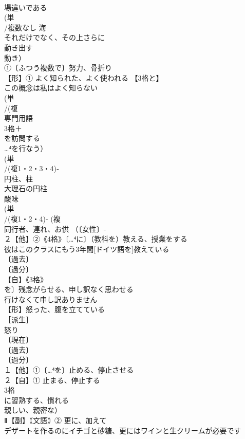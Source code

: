 \documentclass[8pt]{extreport}
\begin{document}
\begin{CJK}{UTF8}{min}
\\	場違いである 
\\	(単
\\	/複数なし 海 
\\	それだけでなく、その上さらに
\\	動き出す 
\\	動き）
\\	①〔ふつう複数で〕努力、骨折り 
\\	【形】① よく知られた、よく使われる 【3格と】
\\	この概念は私はよく知らない
\\	(単
\\	/(複
\\	専門用語 
\\	3格＋
\\	を訪問する 
\\	…⁴を行なう）
\\	(単
\\	/(複1・2・3・4)‐
\\	円柱、柱 
\\	大理石の円柱 
\\	酸味 
\\	(単
\\	/(複1・2・4)- (複
\\	同行者、連れ、お供 （〔女性〕-
\\	２【他】②《4格》〔…⁴に〕（教科を）教える、授業をする　
\\	彼はこのクラスにもう3年間[ドイツ語を]教えている
\\	〔過去〕
\\	〔過分〕
\\	【自】《3格》
\\	を〕残念がらせる、申し訳なく思わせる　
\\	行けなくて申し訳ありません
\\	【形】怒った、腹を立てている 
\\	［派生］ 
\\	怒り
\\	〔現在〕
\\	〔過去〕
\\	〔過分〕
\\	１【他】①〔…⁴を〕止める、停止させる 
\\	２【自】① 止まる、停止する
\\	3格 
\\	に習熟する、慣れる 
\\	親しい、親密な）
\\	Ⅱ【副】｟文語｠② 更に、加えて 
\\	デザートを作るのにイチゴと砂糖、更にはワインと生クリームが必要です

\end{CJK}
\end{document}
